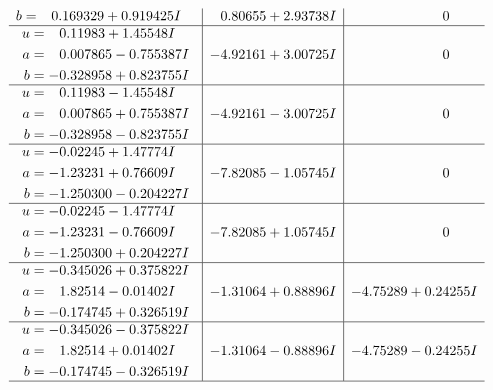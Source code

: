\documentclass[1p]{elsarticle_modified}
\theoremstyle{definition}
\begin{document}
$$\begin{array}{c|c|c}
\begin{aligned}
b &= \phantom{-}0.169329 + 0.919425 I\end{aligned}
 & \phantom{-}0.80655 + 2.93738 I & \phantom{-0.000000 } 0 \\ \hline\begin{aligned}
u &= \phantom{-}0.11983 + 1.45548 I \\
a &= \phantom{-}0.007865 - 0.755387 I \\
b &= -0.328958 + 0.823755 I\end{aligned}
 & -4.92161 + 3.00725 I & \phantom{-0.000000 } 0 \\ \hline\begin{aligned}
u &= \phantom{-}0.11983 - 1.45548 I \\
a &= \phantom{-}0.007865 + 0.755387 I \\
b &= -0.328958 - 0.823755 I\end{aligned}
 & -4.92161 - 3.00725 I & \phantom{-0.000000 } 0 \\ \hline\begin{aligned}
u &= -0.02245 + 1.47774 I \\
a &= -1.23231 + 0.76609 I \\
b &= -1.250300 - 0.204227 I\end{aligned}
 & -7.82085 - 1.05745 I & \phantom{-0.000000 } 0 \\ \hline\begin{aligned}
u &= -0.02245 - 1.47774 I \\
a &= -1.23231 - 0.76609 I \\
b &= -1.250300 + 0.204227 I\end{aligned}
 & -7.82085 + 1.05745 I & \phantom{-0.000000 } 0 \\ \hline\begin{aligned}
u &= -0.345026 + 0.375822 I \\
a &= \phantom{-}1.82514 - 0.01402 I \\
b &= -0.174745 + 0.326519 I\end{aligned}
 & -1.31064 + 0.88896 I & -4.75289 + 0.24255 I \\ \hline\begin{aligned}
u &= -0.345026 - 0.375822 I \\
a &= \phantom{-}1.82514 + 0.01402 I \\
b &= -0.174745 - 0.326519 I\end{aligned}
 & -1.31064 - 0.88896 I & -4.75289 - 0.24255 I\\
 \hline 
 \end{array}$$\newpage$$\begin{array}{c|c|c}  

\end{array}$$
\end{document}
